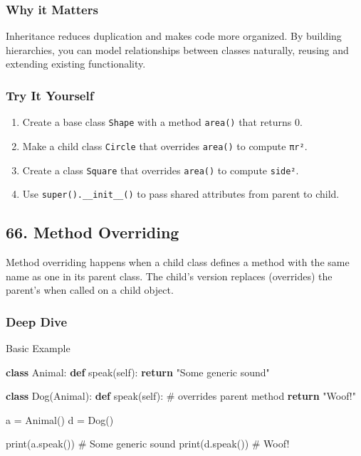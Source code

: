 \documentclass[
  letterpaper,
  DIV=11,
  numbers=noendperiod]{scrreprt}
\newenvironment{Shaded}{\begin{snugshade}}{\end{snugshade}}
\newcommand{\BuiltInTok}[1]{\textcolor[rgb]{0.00,0.23,0.31}{#1}}
\newcommand{\CommentTok}[1]{\textcolor[rgb]{0.37,0.37,0.37}{#1}}
\newcommand{\ControlFlowTok}[1]{\textcolor[rgb]{0.00,0.23,0.31}{\textbf{#1}}}
\newcommand{\KeywordTok}[1]{\textcolor[rgb]{0.00,0.23,0.31}{\textbf{#1}}}
\newcommand{\NormalTok}[1]{\textcolor[rgb]{0.00,0.23,0.31}{#1}}
\newcommand{\OperatorTok}[1]{\textcolor[rgb]{0.37,0.37,0.37}{#1}}
\newcommand{\StringTok}[1]{\textcolor[rgb]{0.13,0.47,0.30}{#1}}
\newcommand{\VariableTok}[1]{\textcolor[rgb]{0.07,0.07,0.07}{#1}}
\providecommand{\tightlist}{%
  \setlength{\itemsep}{0pt}\setlength{\parskip}{0pt}}
\begin{document}
\subsubsection{Why it Matters}\label{why-it-matters-64}

Inheritance reduces duplication and makes code more organized. By
building hierarchies, you can model relationships between classes
naturally, reusing and extending existing functionality.

\subsubsection{Try It Yourself}\label{try-it-yourself-64}

\begin{enumerate}
\def\labelenumi{\arabic{enumi}.}
\tightlist
\item
  Create a base class \texttt{Shape} with a method \texttt{area()} that
  returns 0.
\item
  Make a child class \texttt{Circle} that overrides \texttt{area()} to
  compute \texttt{πr²}.
\item
  Create a class \texttt{Square} that overrides \texttt{area()} to
  compute \texttt{side²}.
\item
  Use \texttt{super().\_\_init\_\_()} to pass shared attributes from
  parent to child.
\end{enumerate}

\subsection{66. Method Overriding}\label{method-overriding}

Method overriding happens when a child class defines a method with the
same name as one in its parent class. The child's version replaces
(overrides) the parent's when called on a child object.

\subsubsection{Deep Dive}\label{deep-dive-65}

Basic Example

\begin{Shaded}
\begin{Highlighting}[]
\KeywordTok{class}\NormalTok{ Animal:}
    \KeywordTok{def}\NormalTok{ speak(}\VariableTok{self}\NormalTok{):}
        \ControlFlowTok{return} \StringTok{"Some generic sound"}

\KeywordTok{class}\NormalTok{ Dog(Animal):}
    \KeywordTok{def}\NormalTok{ speak(}\VariableTok{self}\NormalTok{):   }\CommentTok{\# overrides parent method}
        \ControlFlowTok{return} \StringTok{"Woof!"}

\NormalTok{a }\OperatorTok{=}\NormalTok{ Animal()}
\NormalTok{d }\OperatorTok{=}\NormalTok{ Dog()}

\BuiltInTok{print}\NormalTok{(a.speak())   }\CommentTok{\# Some generic sound}
\BuiltInTok{print}\NormalTok{(d.speak())   }\CommentTok{\# Woof!}
\end{Highlighting}
\end{Shaded}
\end{document}
